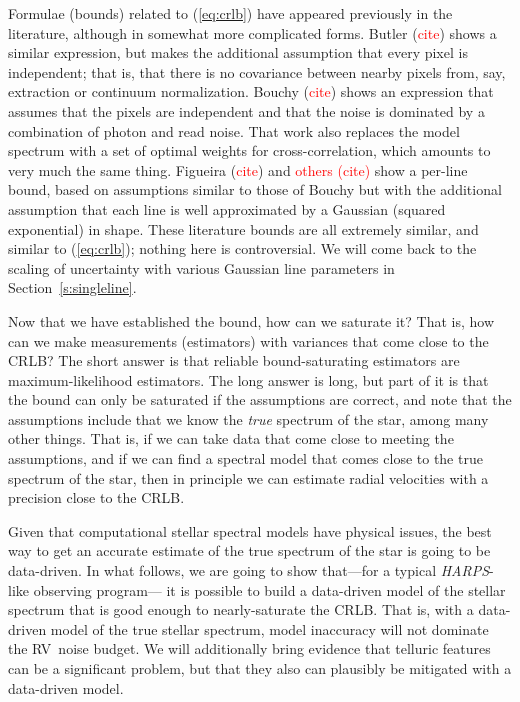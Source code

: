 \documentclass[modern]{aastex62}
\newcommand{\sectionname}{Section}
\newcommand{\todo}[1]{\textcolor{red}{#1}}  %
\newcommand{\acronym}[1]{{\small{#1}}}
\newcommand{\project}[1]{\textsl{#1}}
\newcommand{\HARPS}{\project{\acronym{HARPS}}}
\newcommand{\RV}{\acronym{RV}}
\newcommand{\CRLB}{\acronym{CRLB}}
\begin{document}
Formulae (bounds) related to (\ref{eq:crlb}) have appeared previously
in the literature, although in somewhat more complicated forms.
Butler (\todo{cite}) shows a similar expression, but makes the additional
assumption that every pixel is independent; that is, that there is no
covariance between nearby pixels from, say, extraction or continuum normalization.
Bouchy (\todo{cite}) shows an expression that assumes that the pixels
are independent and that the noise is dominated by a combination of photon
and read noise. 
That work also replaces the model spectrum with a set of optimal
weights for cross-correlation, which amounts to very much the same thing.
Figueira (\todo{cite}) and \todo{others (cite)} show a per-line
bound, based on assumptions similar to those of Bouchy but with the additional assumption that
each line is well approximated by a Gaussian (squared exponential) in shape.
These literature bounds are all extremely similar, and similar to (\ref{eq:crlb});
nothing here is controversial.
We will come back to the scaling of uncertainty with various Gaussian line parameters in \sectionname~\ref{s:singleline}.

Now that we have established the bound, how can we saturate it? That is,
how can we make measurements (estimators)  with variances that come close to the \CRLB?
The short answer is that reliable bound-saturating estimators are maximum-likelihood estimators.
The long answer is long, but part of it is that the bound can only be saturated if the
assumptions are correct, and note that the assumptions include that we know the
\emph{true} spectrum of the star, among many other things.
That is, if we can take data that come close to meeting the assumptions, and
if we can find a spectral model that comes close to the true spectrum of the star,
then in principle we can estimate radial velocities with a precision close to the \CRLB.

Given that computational stellar spectral models have physical issues, the best way
to get an accurate estimate of the true spectrum of the star is going to be data-driven.
In what follows, we are going to show that---for a typical \HARPS-like observing program---%
it is possible to build a data-driven model of the stellar spectrum that is good enough
to nearly-saturate the \CRLB.
That is, with a data-driven model of the true stellar spectrum, model inaccuracy will
not dominate the \RV\ noise budget.
We will additionally bring evidence that telluric features can be a significant problem,
but that they also can plausibly be mitigated with a data-driven model.
\end{document}
